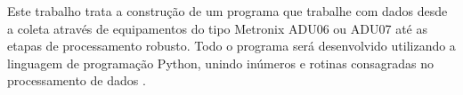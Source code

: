     Este trabalho trata a construção de um programa que trabalhe com dados \MT 
    desde a coleta através de equipamentos do tipo Metronix ADU06 ou ADU07 até as etapas de processamento robusto.
    Todo o programa será desenvolvido utilizando a linguagem de programação Python, unindo inúmeros  e rotinas consagradas no processamento de dados \MT.
